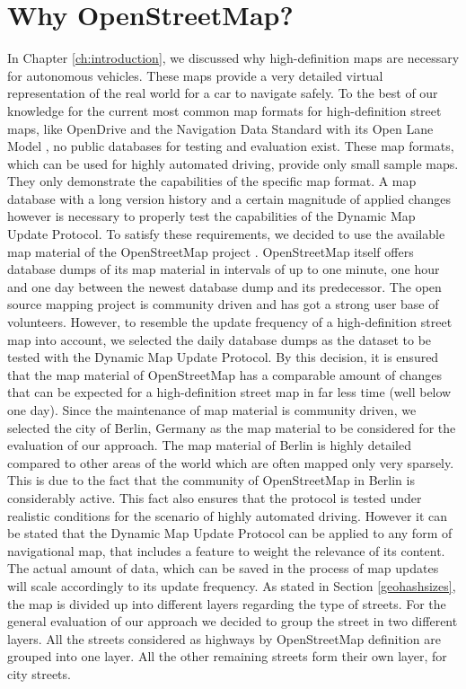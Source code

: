 \section{Why OpenStreetMap?}\label{whyosm}
In Chapter \ref{ch:introduction}, we discussed why high-definition maps are necessary for autonomous vehicles. These maps provide a very detailed virtual representation of the real world for a car to navigate safely. To the best of our knowledge for the current most common map formats for high-definition street maps, like OpenDrive \cite{opendrive} and the Navigation Data Standard with its Open Lane Model \cite{openlanemodel}, no public databases for testing and evaluation exist. These map formats, which can be used for highly automated driving, provide only small sample maps. They only demonstrate the capabilities of the specific map format. A map database with a long version history and a certain magnitude of applied changes however is necessary to properly test the capabilities of the Dynamic Map Update Protocol. To satisfy these requirements, we decided to use the available map material of the OpenStreetMap project \cite{haklay2008openstreetmap}. OpenStreetMap itself offers database dumps of its map material in intervals of up to one minute, one hour and one day between the newest database dump and its predecessor. The open source mapping project is community driven and has got a strong user base of volunteers. However, to resemble the update frequency of a high-definition street map into account, we selected the daily database dumps as the dataset to be tested with the Dynamic Map Update Protocol. By this decision, it is ensured that the map material of OpenStreetMap has a comparable amount of changes that can be expected for a high-definition street map in far less time (well below one day). Since the maintenance of map material is community driven, we selected the city of Berlin, Germany as the map material to be considered for the evaluation of our approach. The map material of Berlin is highly detailed compared to other areas of the world which are often mapped only very sparsely. This is due to the fact that the community of OpenStreetMap in Berlin is considerably active. This fact also ensures that the protocol is tested under realistic conditions for the scenario of highly automated driving. However it can be stated that the Dynamic Map Update Protocol can be applied to any form of navigational map, that includes a feature to weight the relevance of its content. The actual amount of data, which can be saved in the process of map updates will scale accordingly to its update frequency. As stated in Section \ref{geohashsizes}, the map is divided up into different layers regarding the type of streets. For the general evaluation of our approach we decided to group the street in two different layers. All the streets considered as highways by OpenStreetMap definition are grouped into one layer. All the other remaining streets form their own layer, for city streets. \\

